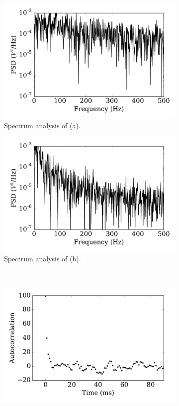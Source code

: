 \begin{figure}[tbp!]
\begin{subfigure}[t]{0.43\textwidth}
		\end{subfigure}\\
		\begin{subfigure}[t]{0.43\textwidth}
			\includegraphics[width=\textwidth]{pics_iconip/psd_tau1.pdf}
			\caption{Spectrum analysis of (a).}
		\end{subfigure}
		\begin{subfigure}[t]{0.43\textwidth}
			\includegraphics[width=\textwidth]{pics_iconip/psd_tau10.pdf}
			\caption{Spectrum analysis of (b).}
		\end{subfigure}\\
		\begin{subfigure}[t]{0.43\textwidth}
			\includegraphics[width=\textwidth]{pics_iconip/autocorr_tau1.pdf}

\end{subfigure}
\end{figure}
